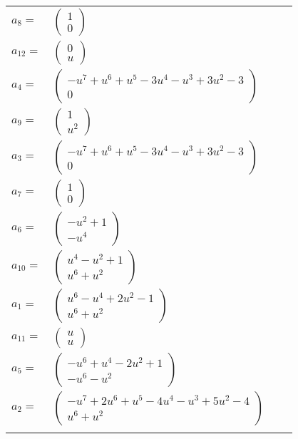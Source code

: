 \documentclass[1p]{elsarticle_modified}
\theoremstyle{definition}
\begin{document}
\begin{tabular}{m{7pt} m{180pt} m{7pt} m{180pt} }
\flushright $a_{8}=$&$\begin{pmatrix}1\\0\end{pmatrix}$ \\
\flushright $a_{12}=$&$\begin{pmatrix}0\\u\end{pmatrix}$ \\
\flushright $a_{4}=$&$\begin{pmatrix}- u^7+u^6+u^5-3 u^4- u^3+3 u^2-3\\0\end{pmatrix}$ \\
\flushright $a_{9}=$&$\begin{pmatrix}1\\u^2\end{pmatrix}$ \\
\flushright $a_{3}=$&$\begin{pmatrix}- u^7+u^6+u^5-3 u^4- u^3+3 u^2-3\\0\end{pmatrix}$ \\
\flushright $a_{7}=$&$\begin{pmatrix}1\\0\end{pmatrix}$ \\
\flushright $a_{6}=$&$\begin{pmatrix}- u^2+1\\- u^4\end{pmatrix}$ \\
\flushright $a_{10}=$&$\begin{pmatrix}u^4- u^2+1\\u^6+u^2\end{pmatrix}$ \\
\flushright $a_{1}=$&$\begin{pmatrix}u^6- u^4+2 u^2-1\\u^6+u^2\end{pmatrix}$ \\
\flushright $a_{11}=$&$\begin{pmatrix}u\\u\end{pmatrix}$ \\
\flushright $a_{5}=$&$\begin{pmatrix}- u^6+u^4-2 u^2+1\\- u^6- u^2\end{pmatrix}$ \\
\flushright $a_{2}=$&$\begin{pmatrix}- u^7+2 u^6+u^5-4 u^4- u^3+5 u^2-4\\u^6+u^2\end{pmatrix}$\\&\end{tabular}
\end{document}
